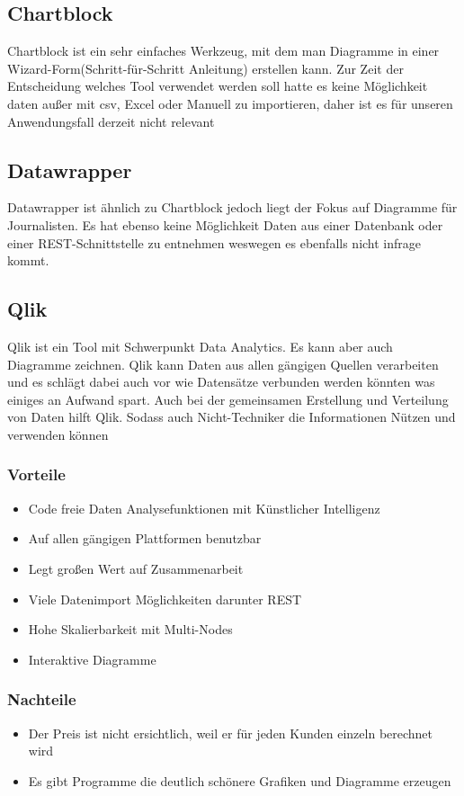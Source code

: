 \subsection{Chartblock}
Chartblock ist ein sehr einfaches Werkzeug, mit dem man Diagramme in einer Wizard-Form(Schritt-für-Schritt Anleitung) erstellen kann. Zur Zeit der Entscheidung welches Tool verwendet werden soll  hatte es keine Möglichkeit daten außer mit csv, Excel oder Manuell zu importieren, daher ist es für unseren Anwendungsfall derzeit nicht relevant
\subsection{Datawrapper}
Datawrapper ist ähnlich zu Chartblock jedoch liegt der Fokus auf Diagramme für Journalisten. Es hat ebenso keine Möglichkeit Daten aus einer Datenbank oder einer REST-Schnittstelle zu entnehmen weswegen es ebenfalls nicht infrage kommt.
\subsection{Qlik}
Qlik ist ein Tool mit Schwerpunkt Data Analytics. Es kann aber auch Diagramme zeichnen.
Qlik kann Daten aus allen gängigen Quellen verarbeiten und es schlägt dabei auch vor wie Datensätze verbunden werden könnten was einiges an Aufwand spart. Auch bei der gemeinsamen Erstellung und Verteilung von Daten hilft Qlik. Sodass auch Nicht-Techniker die Informationen Nützen und verwenden können
\subsubsection{Vorteile} 
\begin{itemize}
\item Code freie Daten Analysefunktionen mit Künstlicher Intelligenz
\item Auf allen gängigen Plattformen benutzbar
\item Legt großen Wert auf Zusammenarbeit
\item Viele Datenimport Möglichkeiten darunter REST
\item Hohe Skalierbarkeit mit Multi-Nodes
\item Interaktive Diagramme
\end{itemize}
\subsubsection{Nachteile}
\begin{itemize}
\item Der Preis ist nicht ersichtlich, weil er für jeden Kunden einzeln berechnet wird
\item Es gibt Programme die deutlich schönere Grafiken und Diagramme erzeugen
\end{itemize}

